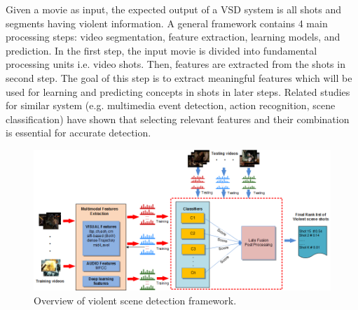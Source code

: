 \documentclass[twocolumn]{bmcart}%
\begin{document}
Given a movie as input, the expected output of a VSD system is all shots and segments having violent information. A general framework contains 4 main processing steps: video segmentation, feature extraction, learning models, and prediction. In the first step, the input movie is divided into fundamental processing units i.e. video shots. Then, features are extracted from the shots in second step. The goal of this step is to extract meaningful features which will be used for learning and predicting concepts in shots in later steps. Related studies for similar system (e.g. multimedia event detection, action recognition, scene classification) have shown that selecting relevant features and their combination is essential for accurate detection.
\begin{figure}
	\centering
	\includegraphics[width=2\linewidth]{Images/Framework1.png}
	\caption{Overview of violent scene detection framework.}
	\label{fig:framework}
\end{figure}
\end{document}
